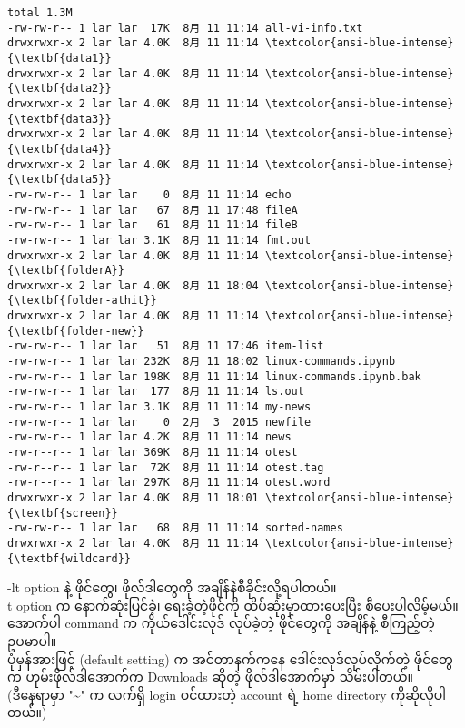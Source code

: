 \documentclass[11pt]{article}
\begin{document}
    \begin{Verbatim}[commandchars=\\\{\}]
total 1.3M
-rw-rw-r-- 1 lar lar  17K  8月 11 11:14 all-vi-info.txt
drwxrwxr-x 2 lar lar 4.0K  8月 11 11:14 \textcolor{ansi-blue-intense}{\textbf{data1}}
drwxrwxr-x 2 lar lar 4.0K  8月 11 11:14 \textcolor{ansi-blue-intense}{\textbf{data2}}
drwxrwxr-x 2 lar lar 4.0K  8月 11 11:14 \textcolor{ansi-blue-intense}{\textbf{data3}}
drwxrwxr-x 2 lar lar 4.0K  8月 11 11:14 \textcolor{ansi-blue-intense}{\textbf{data4}}
drwxrwxr-x 2 lar lar 4.0K  8月 11 11:14 \textcolor{ansi-blue-intense}{\textbf{data5}}
-rw-rw-r-- 1 lar lar    0  8月 11 11:14 echo
-rw-rw-r-- 1 lar lar   67  8月 11 17:48 fileA
-rw-rw-r-- 1 lar lar   61  8月 11 11:14 fileB
-rw-rw-r-- 1 lar lar 3.1K  8月 11 11:14 fmt.out
drwxrwxr-x 2 lar lar 4.0K  8月 11 11:14 \textcolor{ansi-blue-intense}{\textbf{folderA}}
drwxrwxr-x 2 lar lar 4.0K  8月 11 18:04 \textcolor{ansi-blue-intense}{\textbf{folder-athit}}
drwxrwxr-x 2 lar lar 4.0K  8月 11 11:14 \textcolor{ansi-blue-intense}{\textbf{folder-new}}
-rw-rw-r-- 1 lar lar   51  8月 11 17:46 item-list
-rw-rw-r-- 1 lar lar 232K  8月 11 18:02 linux-commands.ipynb
-rw-rw-r-- 1 lar lar 198K  8月 11 11:14 linux-commands.ipynb.bak
-rw-rw-r-- 1 lar lar  177  8月 11 11:14 ls.out
-rw-rw-r-- 1 lar lar 3.1K  8月 11 11:14 my-news
-rw-rw-r-- 1 lar lar    0  2月  3  2015 newfile
-rw-rw-r-- 1 lar lar 4.2K  8月 11 11:14 news
-rw-r--r-- 1 lar lar 369K  8月 11 11:14 otest
-rw-r--r-- 1 lar lar  72K  8月 11 11:14 otest.tag
-rw-r--r-- 1 lar lar 297K  8月 11 11:14 otest.word
drwxrwxr-x 2 lar lar 4.0K  8月 11 18:01 \textcolor{ansi-blue-intense}{\textbf{screen}}
-rw-rw-r-- 1 lar lar   68  8月 11 11:14 sorted-names
drwxrwxr-x 2 lar lar 4.0K  8月 11 11:14 \textcolor{ansi-blue-intense}{\textbf{wildcard}}

    \end{Verbatim}

    -lt option နဲ့ ဖိုင်တွေ၊ ဖိုလ်ဒါတွေကို အချိန်နဲစီခိုင်းလို့ရပါတယ်။\\
t option က နောက်ဆုံးပြင်ခဲ့၊ ရေးခဲ့တဲ့ဖိုင်ကို ထိပ်ဆုံးမှာထားပေးပြီး
စီပေးပါလိမ့်မယ်။\\
အောက်ပါ command က ကိုယ်ဒေါင်းလုဒ် လုပ်ခဲ့တဲ့ ဖိုင်တွေကို အချိန်နဲ့
စီကြည့်တဲ့ ဥပမာပါ။\\
ပုံမှန်အားဖြင့် (default setting) က အင်တာနက်ကနေ ဒေါင်းလုဒ်လုပ်လိုက်တဲ့
ဖိုင်တွေက ဟုမ်းဖိုလ်ဒါအောက်က Downloads ဆိုတဲ့ ဖိုလ်ဒါအောက်မှာ
သိမ်းပါတယ်။\\
(ဒီနေရာမှာ "\textasciitilde{}" က လက်ရှိ login ဝင်ထားတဲ့ account ရဲ့ home
directory ကိုဆိုလိုပါတယ်။)
\end{document}
